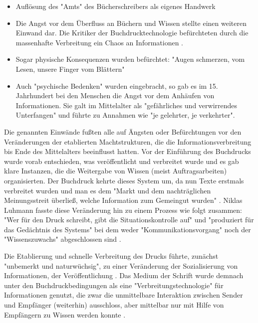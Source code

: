 \begin{itemize}
\item Auflösung des "Amts" des Bücherschreibers als eigenes Handwerk
\item Die Angst vor dem Überfluss an Büchern und Wissen stellte einen weiteren Einwand dar. Die Kritiker der Buchdrucktechnologie befürchteten  durch die massenhafte Verbreitung ein Chaos an Informationen \cite{giesecke_1991_buchdruck}.
\item Sogar physische Konsequenzen wurden befürchtet: "Augen schmerzen, vom Lesen, unsere Finger vom Blättern" \cite{giesecke_1991_buchdruck}
\item Auch "psychische Bedenken" wurden eingebracht, so gab es im 15. Jahrhundert bei den Menschen die Angst vor dem Anhäufen von Informationen. Sie galt im Mittelalter als "gefährliches und verwirrendes Unterfangen" und führte zu Annahmen wie "je gelehrter, je verkehrter". \cite{giesecke_1991_buchdruck}
\end{itemize}

Die genannten Einwände fußten alle auf Ängsten oder Befürchtungen vor den Veränderungen der etablierten Machtstrukturen, die die Informationsverbreitung bis Ende des Mittelalters beeinflusst hatten. Vor der Einführung des Buchdrucks wurde vorab entschieden, was veröffentlicht und verbreitet wurde und es gab klare Instanzen, die die Weitergabe von Wissen (meist Auftragsarbeiten) organisierten. Der Buchdruck kehrte dieses System um, da nun Texte erstmals verbreitet wurden und man es dem "Markt und dem nachträglichen Meinungsstreit überließ, welche Information zum Gemeingut wurden" \cite{giesecke_1991_buchdruck}. Niklas Luhmann fasste diese Veränderung hin zu einem Prozess wie folgt zusammen: "Wer für den Druck schreibt, gibt die Situationskontrolle auf" und "produziert für das Gedächtnis des Systems" bei dem weder "Kommunikationsvorgang" noch der "Wissenszuwachs" abgeschlossen sind \cite{Luhmann1998}.

Die Etablierung und schnelle Verbreitung \cite{stober_2014_pressegeschichte} des Drucks führte, zunächst "unbemerkt und naturwüchsig", zu einer Veränderung der Sozialisierung von Informationen, der Veröffentlichung \cite{giesecke_1991_buchdruck}. Das Medium der Schrift wurde demnach unter den Buchdruckbedingungen als eine "Verbreitungstechnologie" für Informationen genutzt, die zwar die unmittelbare Interaktion zwischen Sender und Empfänger (weiterhin) ausschloss, aber mittelbar nur mit Hilfe von Empfängern zu Wissen werden konnte \cite{Luhmann1998}.

